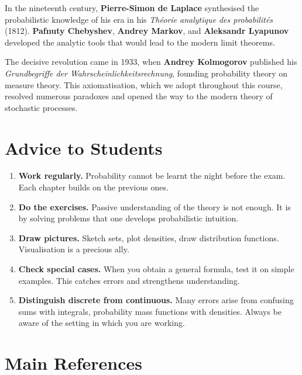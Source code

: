 In the nineteenth century, \textbf{Pierre-Simon de Laplace} synthesised the
probabilistic knowledge of his era in his \textit{Th\'eorie analytique des
probabilit\'es} (1812). \textbf{Pafnuty Chebyshev}, \textbf{Andrey Markov}, and
\textbf{Aleksandr Lyapunov} developed the analytic tools that would lead to the
modern limit theorems.

\medskip

The decisive revolution came in 1933, when \textbf{Andrey Kolmogorov} published his
\textit{Grundbegriffe der Wahrscheinlichkeitsrechnung}, founding probability theory
on measure theory. This axiomatisation, which we adopt throughout this course,
resolved numerous paradoxes and opened the way to the modern theory of stochastic
processes.

\section*{Advice to Students}

\begin{enumerate}
    \item \textbf{Work regularly.} Probability cannot be learnt the night before the
    exam. Each chapter builds on the previous ones.

    \item \textbf{Do the exercises.} Passive understanding of the theory is not
    enough. It is by solving problems that one develops probabilistic intuition.

    \item \textbf{Draw pictures.} Sketch sets, plot densities, draw distribution
    functions. Visualisation is a precious ally.

    \item \textbf{Check special cases.} When you obtain a general formula, test it
    on simple examples. This catches errors and strengthens understanding.

    \item \textbf{Distinguish discrete from continuous.} Many errors arise from
    confusing sums with integrals, probability mass functions with densities.
    Always be aware of the setting in which you are working.
\end{enumerate}

\section*{Main References}

